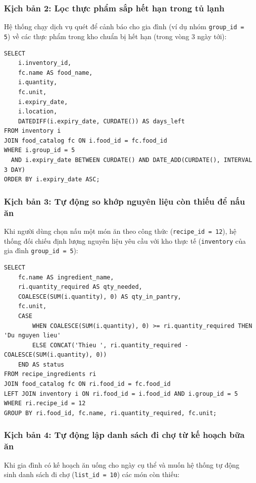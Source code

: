 \documentclass[../main.tex]{subfiles}
\begin{document}
\subsubsection{Kịch bản 2: Lọc thực phẩm sắp hết hạn trong tủ lạnh}
Hệ thống chạy dịch vụ quét để cảnh báo cho gia đình (ví dụ nhóm \texttt{group\_id = 5}) về các thực phẩm trong kho chuẩn bị hết hạn (trong vòng 3 ngày tới):

\begin{lstlisting}[style=mysqlstyle, caption=Query Expiring Foods in Pantry]
SELECT 
    i.inventory_id,
    fc.name AS food_name,
    i.quantity,
    fc.unit,
    i.expiry_date,
    i.location,
    DATEDIFF(i.expiry_date, CURDATE()) AS days_left
FROM inventory i
JOIN food_catalog fc ON i.food_id = fc.food_id
WHERE i.group_id = 5 
  AND i.expiry_date BETWEEN CURDATE() AND DATE_ADD(CURDATE(), INTERVAL 3 DAY)
ORDER BY i.expiry_date ASC;
\end{lstlisting}

\subsubsection{Kịch bản 3: Tự động so khớp nguyên liệu còn thiếu để nấu ăn}
Khi người dùng chọn nấu một món ăn theo công thức (\texttt{recipe\_id = 12}), hệ thống đối chiếu định lượng nguyên liệu yêu cầu với kho thực tế (\texttt{inventory} của gia đình \texttt{group\_id = 5}):

\begin{lstlisting}[style=mysqlstyle, caption=SQL Query to Check Missing Ingredients]
SELECT 
    fc.name AS ingredient_name,
    ri.quantity_required AS qty_needed,
    COALESCE(SUM(i.quantity), 0) AS qty_in_pantry,
    fc.unit,
    CASE 
        WHEN COALESCE(SUM(i.quantity), 0) >= ri.quantity_required THEN 'Du nguyen lieu'
        ELSE CONCAT('Thieu ', ri.quantity_required - COALESCE(SUM(i.quantity), 0))
    END AS status
FROM recipe_ingredients ri
JOIN food_catalog fc ON ri.food_id = fc.food_id
LEFT JOIN inventory i ON ri.food_id = i.food_id AND i.group_id = 5
WHERE ri.recipe_id = 12
GROUP BY ri.food_id, fc.name, ri.quantity_required, fc.unit;
\end{lstlisting}

\subsubsection{Kịch bản 4: Tự động lập danh sách đi chợ từ kế hoạch bữa ăn}
Khi gia đình có kế hoạch ăn uống cho ngày cụ thể và muốn hệ thống tự động sinh danh sách đi chợ (\texttt{list\_id = 10}) các món còn thiếu:
\end{document}
